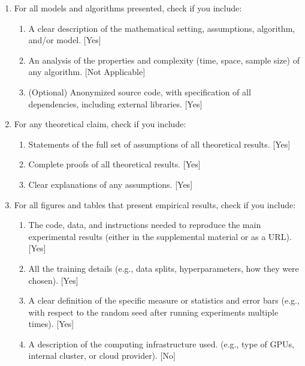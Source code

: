 \documentclass[twoside]{article}
\theoremstyle{plain}
\begin{document}
 \begin{enumerate}

 \item For all models and algorithms presented, check if you include:
 \begin{enumerate}
   \item A clear description of the mathematical setting, assumptions, algorithm, and/or model. [Yes]
   \item An analysis of the properties and complexity (time, space, sample size) of any algorithm. [Not Applicable]
   \item (Optional) Anonymized source code, with specification of all dependencies, including external libraries. [Yes]
 \end{enumerate}

 \item For any theoretical claim, check if you include:
 \begin{enumerate}
   \item Statements of the full set of assumptions of all theoretical results. [Yes]
   \item Complete proofs of all theoretical results. [Yes]
   \item Clear explanations of any assumptions. [Yes]     
 \end{enumerate}

 \item For all figures and tables that present empirical results, check if you include:
 \begin{enumerate}
   \item The code, data, and instructions needed to reproduce the main experimental results (either in the supplemental material or as a URL). [Yes]
   \item All the training details (e.g., data splits, hyperparameters, how they were chosen). [Yes]
         \item A clear definition of the specific measure or statistics and error bars (e.g., with respect to the random seed after running experiments multiple times). [Yes]
         \item A description of the computing infrastructure used. (e.g., type of GPUs, internal cluster, or cloud provider). [No]
 \end{enumerate}


\end{enumerate}
\end{document}
